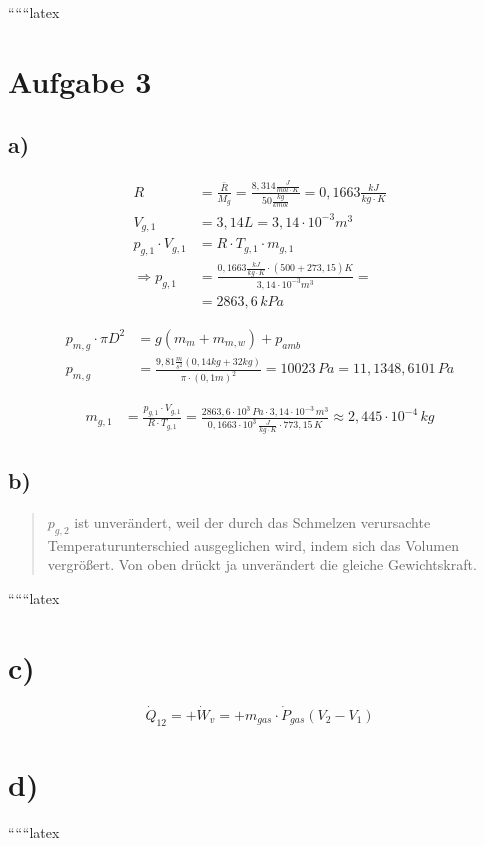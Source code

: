 
``````latex


\section*{Aufgabe 3}

\subsection*{a)}

\begin{align*}
R &= \frac{\bar{R}}{M_g} = \frac{8,314 \frac{J}{mol \cdot K}}{50 \frac{kg}{kmol}} = 0,1663 \frac{kJ}{kg \cdot K} \\
V_{g,1} &= 3,14 L = 3,14 \cdot 10^{-3} m^3 \\
p_{g,1} \cdot V_{g,1} &= R \cdot T_{g,1} \cdot m_{g,1} \\
\Rightarrow p_{g,1} &= \frac{0,1663 \frac{kJ}{kg \cdot K} \cdot (500 + 273,15) K}{3,14 \cdot 10^{-3} m^3} = \\
&= 2863,6 \, kPa
\end{align*}

\begin{align*}
p_{m,g} \cdot \pi D^2 &= g \left( m_m + m_{m,w} \right) + p_{amb} \\
p_{m,g} &= \frac{9,81 \frac{m}{s^2} (0,14 kg + 32 kg)}{\pi \cdot (0,1 m)^2} = 10023 \, Pa = 11,1348,6101 \, Pa
\end{align*}

\begin{align*}
m_{g,1} &= \frac{p_{g,1} \cdot V_{g,1}}{R \cdot T_{g,1}} = \frac{2863,6 \cdot 10^3 \, Pa \cdot 3,14 \cdot 10^{-3} \, m^3}{0,1663 \cdot 10^3 \, \frac{J}{kg \cdot K} \cdot 773,15 \, K} \approx 2,445 \cdot 10^{-4} \, kg
\end{align*}

\subsection*{b)}

\begin{quote}
$p_{g,2}$ ist unverändert, weil der durch das Schmelzen verursachte Temperaturunterschied ausgeglichen wird, indem sich das Volumen vergrößert. Von oben drückt ja unverändert die gleiche Gewichtskraft.
\end{quote}

``````latex

\section*{c)}

\begin{equation}
\dot{Q}_{12} = +\dot{W}_v = +m_{gas} \cdot \dot{P}_{gas} \left( V_2 - V_1 \right)
\end{equation}

\section*{d)}

``````latex


